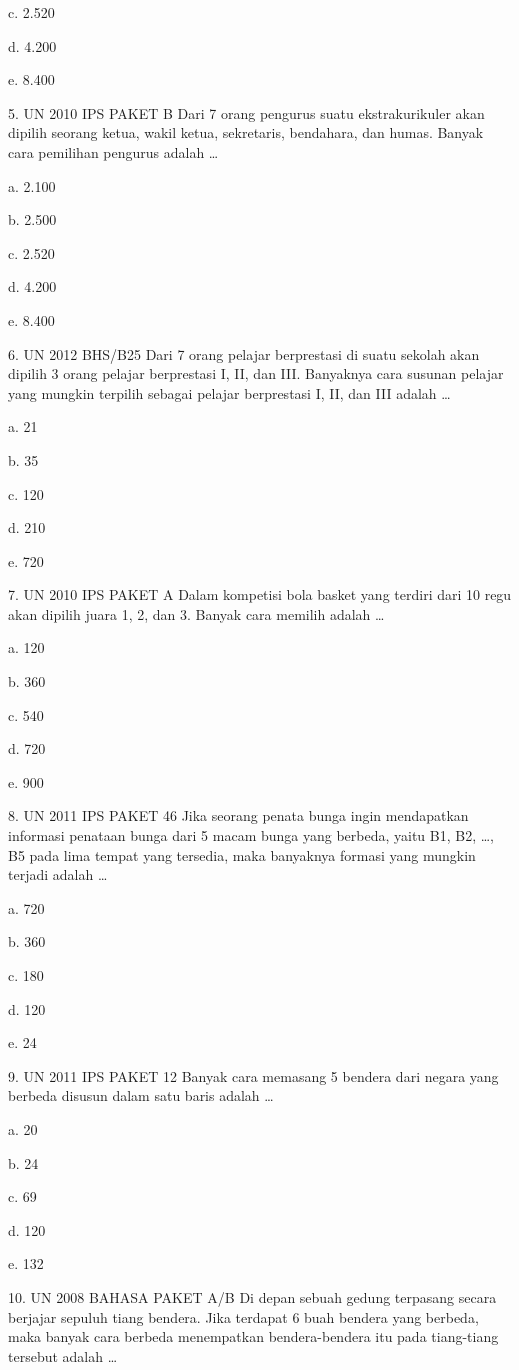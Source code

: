 \documentclass[11pt,fleqn]{book} %
\begin{document}
c.	2.520


d.	4.200

e.	8.400

5.	UN 2010 IPS PAKET B 
Dari 7 orang pengurus suatu ekstrakurikuler akan dipilih seorang ketua, wakil ketua, sekretaris, bendahara, dan humas. Banyak cara pemilihan pengurus adalah …

a.	2.100

b.	2.500

c.	2.520

d.	4.200


e.	8.400

6.	UN 2012 BHS/B25
Dari 7 orang pelajar berprestasi di suatu sekolah akan dipilih 3 orang pelajar berprestasi I, II, dan III. Banyaknya cara susunan pelajar yang mungkin terpilih sebagai pelajar berprestasi I, II, dan III adalah …

a.	21

b.	35

c.	120

d.	210

e.	720


7.	UN 2010 IPS PAKET A 
Dalam kompetisi bola basket yang terdiri dari 10 regu akan dipilih juara 1, 2, dan 3. Banyak cara memilih adalah …

a.	120

b.	360

c.	540

d.	720

e.	900

8.	UN 2011 IPS PAKET 46
Jika seorang penata bunga ingin mendapatkan informasi penataan bunga dari 5 macam bunga yang berbeda, yaitu B1, B2, …, B5 pada lima tempat yang tersedia, maka banyaknya formasi yang mungkin terjadi adalah …

a.	720

b.	360

c.	180

d.	120

e.	24

9.	UN 2011 IPS PAKET 12 
Banyak cara memasang 5 bendera dari negara yang berbeda disusun dalam satu baris adalah …

a.	20

b.	24

c.	69

d.	120

e.	132

10.	UN 2008 BAHASA PAKET A/B 
Di depan sebuah gedung terpasang secara berjajar sepuluh tiang bendera. Jika terdapat 6 buah bendera yang berbeda, maka banyak cara berbeda menempatkan bendera-bendera itu pada tiang-tiang tersebut adalah …
\end{document}
